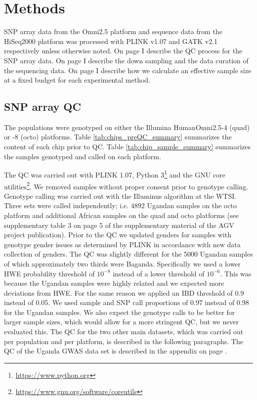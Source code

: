 \section{Methods}

SNP array data from the Omni2.5 platform and sequence data from the HiSeq2000 platform was processed with PLINK v1.07\cite{Purcell2007} and \gls{GATK} v2.1 respectively unless otherwise noted. On page \pageref{subsec:chipQC} I describe the QC process for the SNP array data. On page \pageref{subsec:sequence} I describe the down sampling and the data curation of the sequencing data. On page \pageref{subsec:samplesize} I describe how we calculate an effective sample size at a fixed budget for each experimental method.

\subsection{SNP array QC}
\label{subsec:chipQC}

The populations were genotyped on either the Illumina HumanOmni2.5-4 (quad) or -8 (octo) platforms. Table \ref{tab:chips_preQC_summary} summarizes the content of each chip prior to QC. Table \ref{tab:chip_sample_summary} summarizes the samples genotyped and called on each platform.



The \gls{QC} was carried out with PLINK 1.07\cite{Purcell2007}, Python 3\footnote{\url{https://www.python.org}} and the GNU core utilities\footnote{\url{https://www.gnu.org/software/coreutils}}. We removed samples without proper consent prior to genotype calling. Genotype calling was carried out with the Illuminus algorithm at the \gls{WTSI}. Three sets were called independently; i.e. 4892 Ugandan samples on the octo platform and additional African samples on the quad and octo platforms (see supplementary table 3 on page 5 of the supplementary material of the \gls{AGV} project publication\cite{Gurdasani2015}). Prior to the \gls{QC} we updated genders for samples with genotype gender issues as determined by PLINK in accordance with new data collection of genders. The QC was slightly different for the 5000 Ugandan samples of which approximately two thirds were Baganda. Specifically we used a lower \gls{HWE} probability threshold of $10^{-8}$ instead of a lower threshold of $10^{-6}$. This was because the Ugandan samples were highly related and we expected more deviations from \gls{HWE}. For the same reason we applied an \gls{IBD} threshold of 0.9 instead of 0.05. We used sample and \gls{SNP} call proportions of 0.97 instead of 0.98 for the Ugandan samples. We also expect the genotype calls to be better for larger sample sizes, which would allow for a more stringent \gls{QC}, but we never evaluated this. The \gls{QC} for the two other main datasets, which was carried out per population and per platform, is described in the following paragraphs. The \gls{QC} of the Uganda \gls{GWAS} data set is described in the appendix on page \pageref{app:qc_uganda_gwas}.

